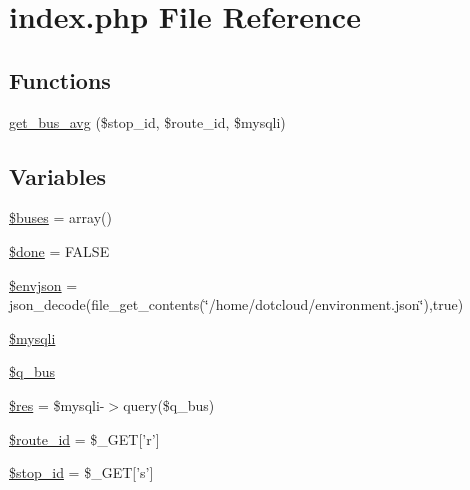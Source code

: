 \hypertarget{index_8php}{
\section{index.php File Reference}
\label{index_8php}
}
\subsection*{Functions}
\begin{DoxyCompactItemize}
\item 
\hyperlink{index_8php_ab3b9e6b803a65641a6cbc175205a076f_ab3b9e6b803a65641a6cbc175205a076f}{get\_\-bus\_\-avg} (\$stop\_\-id, \$route\_\-id, \$mysqli)
\end{DoxyCompactItemize}
\subsection*{Variables}
\begin{DoxyCompactItemize}
\item 
\hyperlink{index_8php_ae7ef8ab0940cf7a7e9a8a2bb0f3b47b0_ae7ef8ab0940cf7a7e9a8a2bb0f3b47b0}{\$buses} = array()
\item 
\hyperlink{index_8php_a2698dc52f06950fcdbaca1e94f88c1ff_a2698dc52f06950fcdbaca1e94f88c1ff}{\$done} = FALSE
\item 
\hyperlink{index_8php_a22377fbdee6b0aad7e6e4b043f2b6603_a22377fbdee6b0aad7e6e4b043f2b6603}{\$envjson} = json\_\-decode(file\_\-get\_\-contents(\char`\"{}/home/dotcloud/environment.json\char`\"{}),true)
\item 
\hyperlink{index_8php_a580989e8e3521433691a0351287f6315_a580989e8e3521433691a0351287f6315}{\$mysqli}
\item 
\hyperlink{index_8php_a531a3cdb9017f75f6acb74a688f1ceeb_a531a3cdb9017f75f6acb74a688f1ceeb}{\$q\_\-bus}
\item 
\hyperlink{index_8php_a49a8a4009b02e49717caa88b128affc5_a49a8a4009b02e49717caa88b128affc5}{\$res} = \$mysqli-\/$>$query(\$q\_\-bus)
\item 
\hyperlink{index_8php_a053b1e7578c0ad2a0dd68068b071f3ed_a053b1e7578c0ad2a0dd68068b071f3ed}{\$route\_\-id} = \$\_\-GET\mbox{[}'r'\mbox{]}
\item 
\hyperlink{index_8php_addc5e9981ac50c577e366f562a9382fe_addc5e9981ac50c577e366f562a9382fe}{\$stop\_\-id} = \$\_\-GET\mbox{[}'s'\mbox{]}
\end{DoxyCompactItemize}



